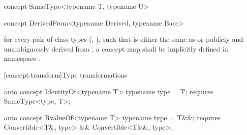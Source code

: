 \documentclass[american,twoside]{book}
\begin{document}
\begin{itemdescr}
\pnum
{} 

\pnum
{}
\end{itemdescr}

\begin{itemdecl}
concept SameType<typename T, typename U> { }
\end{itemdecl}

\begin{itemdescr}
\pnum
{}
\end{itemdescr}

\begin{itemdecl}
concept DerivedFrom<typename Derived, typename Base> { }
\end{itemdecl}

\begin{itemdescr}
\pnum
\mbox{\requires}
for every pair of class types (\mbox{}, \mbox{}),
such that \mbox{} is either the same as or publicly and
unambiguously derived from \mbox{}, a concept map
\mbox{} shall be implicitly defined in namespace
\mbox{}.
\end{itemdescr}

[concept.transform]{Type transformations}
\begin{itemdecl}
auto concept IdentityOf<typename T> {
  typename type = T;
  requires SameType<type, T>;
}
\end{itemdecl}

\begin{itemdescr}
\pnum
{} 
\end{itemdescr}

\begin{itemdecl}
auto concept RvalueOf<typename T> {
  typename type = T&&;
  requires Convertible<T&, type> && Convertible<T&&, type>;
}
\end{itemdecl}

\begin{itemdescr}
\pnum
{} 
\end{itemdescr}
\end{document}

